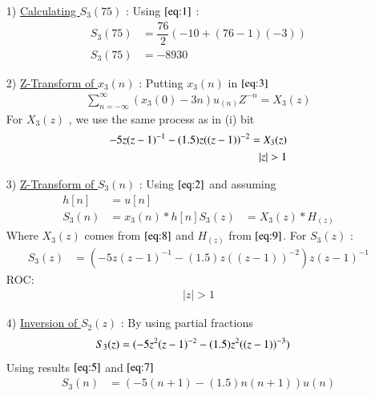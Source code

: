 \documentclass[journal,12pt,twocolumn]{IEEEtran}
\theoremstyle{remark}
\begin{document}
\begin{enumerate}
\item[1)]
\underline{Calculating $S_3(75)$} :
Using $\eqref{eq:1}$ :\vspace{0.05cm}
\begin{align}
    S_3(75) &= \dfrac{76}{2}(-10+(76-1)(-3))\\
   S_3(75) &= -8930
    \end{align}

\item[2)] 
\underline{Z-Transform of $x_3(n)$} :
Putting $x_3(n)$ in $\eqref{eq:3}$
\vspace{0.05cm}
\begin{align}
\sum_{n=-\infty}^{\infty}(x_3(0) -3n)u_{(n)}Z^{-n} =X_3(z)
\end{align}
For $X_3(z)$ , we use the same process as in (i) bit\vspace{0.05cm}
\begin{align}
  \notag -5z(z-1)^{-1}-
       (1.5)z((z-1))^{-2}=X_3(z) \label{eq:8}\\
           \lvert z\rvert  >  1 
\end{align}

    \vspace{0.7cm}
\item[3)]
\underline{Z-Transform of $S_3(n)$} :
Using $\eqref{eq:2}$ and assuming 
\begin{align}
         h[n] &= u[n] \\
    S_3(n) &= x_3(n) * h[n] 
    S_3(z) &= X_3(z) * H_(z)
    \end{align}
    Where $X_3(z)$ comes from $\eqref{eq:8}$ and $H_(z)$ from $\eqref{eq:9}$.
    \vspace{0.05cm}
    For $S_3(z)$ :
    \begin{align}
            S_3(z) &= (-5z(z-1)^{-1}-
       (1.5)z((z-1))^{-2})z(z-1)^{-1}
    \end{align}
    ROC:
    \begin{align} 
    \lvert z \rvert > 1
    \end{align}
    
    \item[4)]
\underline{Inversion of $S_2(z)$} :
By using partial fractions 
\begin{align}
    S_3(z) &= \notag(-5z^2(z-1)^{-2} - (1.5)z^2((z-1))^{-3}) 
\end{align}
Using results $\eqref{eq:5}$ and $\eqref{eq:7}$
\begin{align}
 S_3(n) &= (-5(n+1) - (1.5)n(n+1))u(n)   
\end{align}


\end{enumerate}
\end{document}
